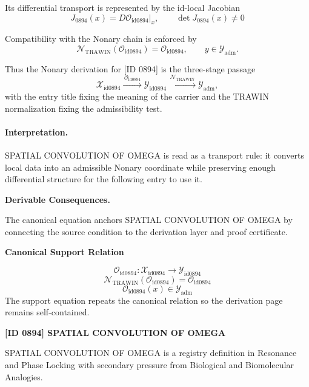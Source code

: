 Its differential transport is represented by the id-local Jacobian\[
J_{0894}(x)=D\mathcal{O}_{\mathrm{id0894}}\big|_x,\qquad \det J_{0894}(x)\neq 0
\]

Compatibility with the Nonary chain is enforced by\[
\mathcal{N}_{\mathrm{TRAWIN}}(\mathcal{O}_{\mathrm{id0894}})=\mathcal{O}_{\mathrm{id0894}},\qquad y\in\mathcal{Y}_{\mathrm{adm}}.
\]

Thus the Nonary derivation for [ID 0894] is the three-stage passage
\[
\mathcal{X}_{\mathrm{id0894}}\xrightarrow{\,\mathcal{O}_{\mathrm{id0894}}\,} \mathcal{Y}_{\mathrm{id0894}}\xrightarrow{\,\mathcal{N}_{\mathrm{TRAWIN}}\,} \mathcal{Y}_{\mathrm{adm}},
\]
with the entry title fixing the meaning of the carrier and the TRAWIN normalization fixing the admissibility test.

\paragraph{Interpretation.} SPATIAL CONVOLUTION OF OMEGA is read as a transport rule: it converts local data into an admissible Nonary coordinate while preserving enough differential structure for the following entry to use it.

\par\vspace{0.35em}
\noindent\textbf{Derivable Consequences.}\quad
\begingroup
\footnotesize
\raggedright
The canonical equation anchors SPATIAL CONVOLUTION OF OMEGA by connecting the source condition to the derivation layer and proof certificate.
\par\endgroup

\noindent\textbf{Canonical Support Relation}\par
\[
\mathcal{O}_{\mathrm{id0894}}:\mathcal{X}_{\mathrm{id0894}}\longrightarrow\mathcal{Y}_{\mathrm{id0894}}
\]
\[
\mathcal{N}_{\mathrm{TRAWIN}}(\mathcal{O}_{\mathrm{id0894}})=\mathcal{O}_{\mathrm{id0894}}
\]
\[
\mathcal{O}_{\mathrm{id0894}}(x)\in\mathcal{Y}_{\mathrm{adm}}
\]
\noindent The support equation repeats the canonical relation so the derivation page remains self-contained.\par

\clearpage
\noindent\textbf{[ID 0894] SPATIAL CONVOLUTION OF OMEGA}\par
\vspace{0.35em}
\begingroup\small
{}
SPATIAL CONVOLUTION OF OMEGA is a registry definition in Resonance and Phase Locking with secondary pressure from Biological and Biomolecular Analogies.


